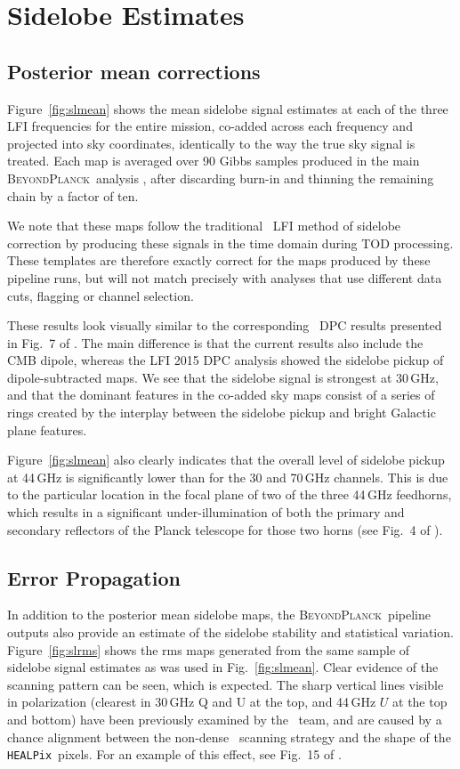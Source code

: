 \documentclass[twocolumn]{aa}
\def\healpix{\texttt{HEALPix}}
\newcommand{\BP}{\textsc{BeyondPlanck}}
\begin{document}
\section{Sidelobe Estimates}
\subsection{Posterior mean corrections}

Figure~\ref{fig:slmean} shows the mean sidelobe signal estimates at each of the three LFI frequencies for the entire mission, co-added across each frequency and projected into sky coordinates, identically to the way the true sky signal is treated. Each map is averaged over 90 Gibbs samples produced in the main \BP\ analysis \citep{BP01}, after discarding burn-in and thinning the remaining chain by a factor of ten.

We note that these maps follow the traditional \Planck\ LFI method of sidelobe correction by producing these signals in the time domain during TOD processing. These templates are therefore exactly correct for the maps produced by these pipeline runs, but will not match precisely with analyses that use different data cuts, flagging or channel selection.

These results look visually similar to the corresponding \Planck\ DPC results presented in Fig.~7 of \citet{planck2014-a04}. The main difference is that the current results also include the CMB dipole, whereas the LFI 2015 DPC analysis showed the sidelobe pickup of dipole-subtracted maps. We see that the sidelobe signal is strongest at 30\,GHz, and that the dominant features in the co-added sky maps consist of a series of rings created by the interplay between the sidelobe pickup and bright Galactic plane features. 

Figure~\ref{fig:slmean} also clearly indicates that the overall level of sidelobe pickup at 44\,GHz is significantly lower than for the 30 and 70\,GHz channels. This is due to the particular location in the focal plane of two of the three 44\,GHz feedhorns, which results in a significant under-illumination of both the primary and secondary reflectors of the Planck telescope for those two horns (see Fig.~4 of \cite{sandri2010}).

\subsection{Error Propagation}

In addition to the posterior mean sidelobe maps, the \BP\ pipeline outputs also provide an estimate of the sidelobe stability and statistical variation. Figure~\ref{fig:slrms} shows the rms maps generated from the same sample of sidelobe signal estimates as was used in Fig.~\ref{fig:slmean}. Clear evidence of the scanning pattern can be seen, which is expected. The sharp vertical lines visible in polarization (clearest in 30\,GHz Q and U at the top, and 44\,GHz $U$ at the top and bottom) have been previously examined by the \Planck\ team, and are caused by a chance alignment between the non-dense \Planck\ scanning strategy and the shape of the \healpix\ pixels. For an example of this effect, see Fig.~15 of \citet{planck2013-p03c}.
\end{document}
